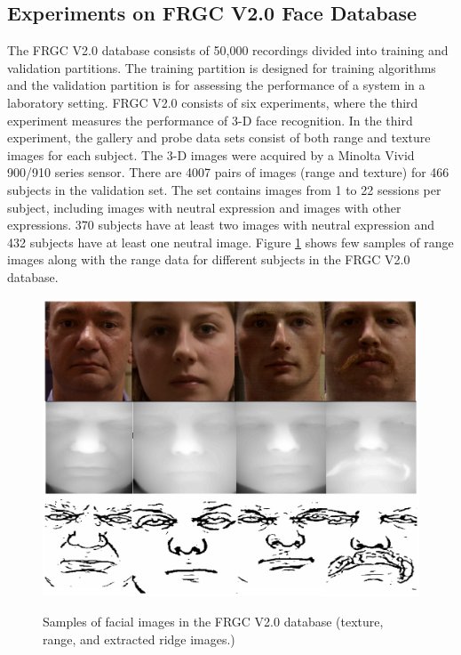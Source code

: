 \subsection{Experiments on FRGC V2.0 Face Database}
The FRGC V2.0 database \cite{FRGC2005} consists of 50,000 recordings
divided into training and validation partitions. The training
partition is designed for training algorithms and the validation
partition is for assessing the performance of a system in a
laboratory setting. FRGC V2.0 consists of six experiments, where the
third experiment measures the performance of 3-D face recognition.
In the third experiment, the gallery and probe data sets consist of
both range and texture images for each subject. The 3-D images were
acquired by a Minolta Vivid 900/910 series sensor. There are 4007
pairs of images (range and texture) for 466 subjects in the
validation set. The set contains images from 1 to 22 sessions per
subject, including images with neutral expression and images with
other expressions. 370 subjects have at least two images with
neutral expression and 432 subjects have at least one neutral image.
Figure \ref{fig_FRGC_samples} shows few samples of range images
along with the range data for different subjects in the FRGC V2.0
database.
\begin{figure}[tbp]
\begin{center}
  \includegraphics[scale = 0.75]{./chapters/Figures/frgc_samples.eps}\\
  \caption{Samples of facial images in the FRGC V2.0 database (texture, range, and extracted ridge images.)}
  \label{fig_FRGC_samples}
\end{center}
\end{figure}

